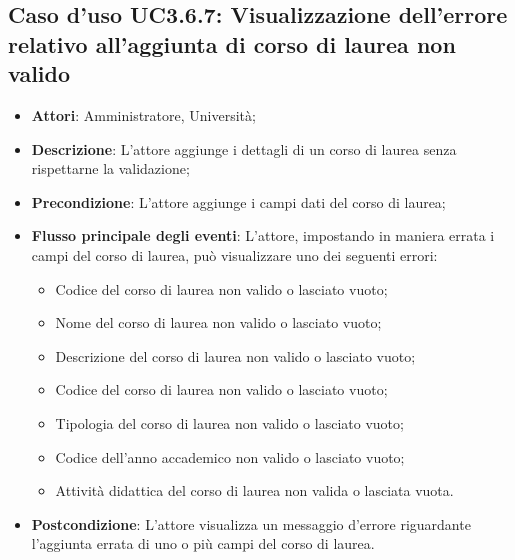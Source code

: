 \subsection{Caso d'uso \texorpdfstring{UC3.6.7}{UC3.6.7}: Visualizzazione dell'errore relativo all’aggiunta di corso di laurea non valido }
\begin{itemize}
\item \textbf{Attori}: Amministratore, Università;
\item \textbf{Descrizione}: L'attore aggiunge i dettagli di un corso di laurea senza rispettarne la validazione;

\item \textbf{Precondizione}: L'attore aggiunge i campi dati del corso di laurea;

\item \textbf{Flusso principale degli eventi}: L'attore, impostando in maniera errata i campi del corso di laurea, può visualizzare uno dei seguenti errori: \begin{itemize}
\item Codice del corso di laurea non valido o lasciato vuoto;
\item Nome del corso di laurea non valido o lasciato vuoto;
\item Descrizione del corso di laurea non valido o lasciato vuoto;
\item Codice del corso di laurea non valido o lasciato vuoto;
\item Tipologia del corso di laurea non valido o lasciato vuoto;
\item Codice dell'anno accademico non valido o lasciato vuoto;
\item Attività didattica del corso di laurea non valida o lasciata vuota.
\end{itemize}

\item \textbf{Postcondizione}: L'attore visualizza un messaggio d'errore riguardante l'aggiunta errata di uno o più campi del corso di laurea.

\end{itemize}
